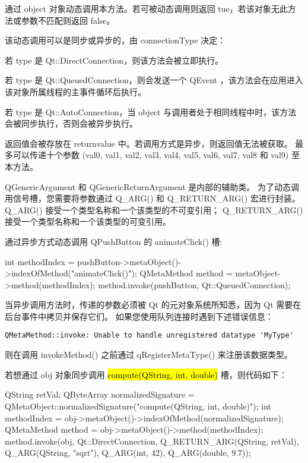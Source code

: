 通过 object 对象动态调用本方法。若可被动态调用则返回 tue，若该对象无此方法或参数不匹配则返回 false。

该动态调用可以是同步或异步的，由 connectionType 决定：

\begin{compactitem}
\item 若 type 是 Qt::DirectConnection，则该方法会被立即执行。
\item 若 type 是 Qt::QueuedConnection，则会发送一个 QEvent ，该方法会在应用进入该对象所属线程的主事件循环后执行。
\item 若 type 是 Qt::AutoConnection，当 object 与调用者处于相同线程中时，该方法会被同步执行，否则会被异步执行。
\end{compactitem}

返回值会被存放在 returnvalue 中。若调用方式是异步，则返回值无法被获取。
最多可以传递十个参数 (val0, val1, val2, val3, val4, val5, val6, val7, val8 和 val9) 至本方法。

QGenericArgument 和 QGenericReturnArgument 是内部的辅助类。
为了动态调用信号槽，您需要将参数通过 Q\_ARG() 和 Q\_RETURN\_ARG() 宏进行封装。
Q\_ARG() 接受一个类型名称和一个该类型的不可变引用；
Q\_RETURN\_ARG() 接受一个类型名称和一个该类型的可变引用。

通过异步方式动态调用 QPushButton 的 animateClick() 槽:

\begin{cppcode}
int methodIndex = pushButton->metaObject()->indexOfMethod("animateClick()");
QMetaMethod method = metaObject->method(methodIndex);
method.invoke(pushButton, Qt::QueuedConnection);
\end{cppcode}

当异步调用方法时，传递的参数必须被 Qt 的元对象系统所知悉，因为 Qt 需要在后台事件中拷贝并保存它们。
如果您使用队列连接时遇到下述错误信息：

\begin{lstlisting}
QMetaMethod::invoke: Unable to handle unregistered datatype 'MyType'	
\end{lstlisting}

则在调用 invokeMethod() 之前通过 qRegisterMetaType() 来注册该数据类型。

若想通过 obj 对象同步调用 \hl{compute(QString, int, double)} 槽，则代码如下：

\begin{cppcode}
QString retVal;
QByteArray normalizedSignature = QMetaObject::normalizedSignature("compute(QString, int, double)");
int methodIndex = obj->metaObject()->indexOfMethod(normalizedSignature);
QMetaMethod method = obj->metaObject()->method(methodIndex);
method.invoke(obj,
              Qt::DirectConnection,
              Q_RETURN_ARG(QString, retVal),
              Q_ARG(QString, "sqrt"),
              Q_ARG(int, 42),
              Q_ARG(double, 9.7));
\end{cppcode}


